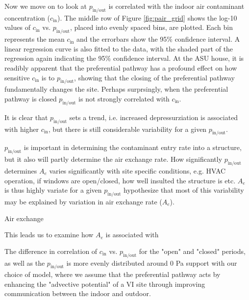\documentclass[journal=esthag,manuscript=article]{achemso}
\begin{document}
Now we move on to look at $p_\mathrm{in/out}$ is correlated with the indoor air contaminant concentration ($c_\mathrm{in}$).
The middle row of Figure \ref{fig:pair_grid} shows the log-10 values of $c_\mathrm{in}$ vs. $p_\mathrm{in/out}$, placed into evenly spaced bins, are plotted.
Each bin represents the mean $c_\mathrm{in}$ and the errorbars show the 95\% confidence interval. %
A linear regression curve is also fitted to the data, with the shaded part of the regression again indicating the 95\% confidence interval. %
At the ASU house, it is readibly apparent that the preferential pathway has a profound effect on how sensitive $c_\mathrm{in}$ is to $p_\mathrm{in/out}$, showing that the closing of the preferential pathway fundamentally changes the site.
Perhaps surprsingly, when the preferential pathway is closed $p_\mathrm{in/out}$ is not strongly correlated with $c_\mathrm{in}$.


It is clear that $p_\mathrm{in/out}$ sets a trend, i.e. increased depressurziation is associated with higher $c_\mathrm{in}$, but there is still considerable variability for a given $p_\mathrm{in/out}$.


$p_\mathrm{in/out}$ is important in determining the contaminant entry rate into a structure, but it also will partly determine the air exchange rate.
How significantly $p_\mathrm{in/out}$ determines $A_e$ varies significantly with site specific conditions, e.g. HVAC operation, if windows are open/closed, how well insulted the structure is etc.
$A_e$ is thus highly variate for a given $p_\mathrm{in/out}$ hypothesize that most of this variability may be explained by variation in air exchange rate ($A_e$).

Air exchange

This leads us to examine how $A_e$ is associated with


The difference in correlation of $c_\mathrm{in}$ vs. $p_\mathrm{in/out}$ for the "open" and "closed" periods, as well as the $p_\mathrm{in/out}$ is more evenly distributed around 0 Pa support with our choice of model, where we assume that the preferential pathway acts by enhancing the "advective potential" of a VI site through improving communication between the indoor and outdoor.


\end{document}
